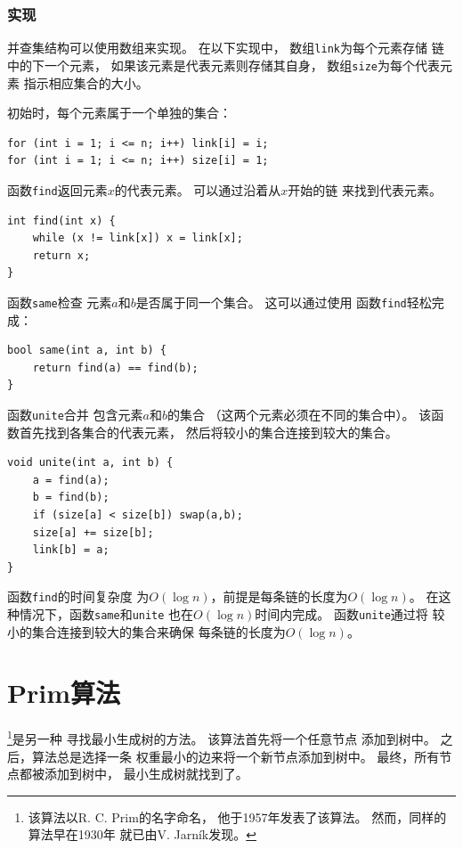 \subsubsection{实现}

并查集结构可以使用数组来实现。
在以下实现中，
数组\texttt{link}为每个元素存储
链中的下一个元素，
如果该元素是代表元素则存储其自身，
数组\texttt{size}为每个代表元素
指示相应集合的大小。

初始时，每个元素属于一个单独的集合：
\begin{lstlisting}
for (int i = 1; i <= n; i++) link[i] = i;
for (int i = 1; i <= n; i++) size[i] = 1;
\end{lstlisting}

函数\texttt{find}返回元素$x$的代表元素。
可以通过沿着从$x$开始的链
来找到代表元素。

\begin{lstlisting}
int find(int x) {
    while (x != link[x]) x = link[x];
    return x;
}
\end{lstlisting}

函数\texttt{same}检查
元素$a$和$b$是否属于同一个集合。
这可以通过使用
函数\texttt{find}轻松完成：

\begin{lstlisting}
bool same(int a, int b) {
    return find(a) == find(b);
}
\end{lstlisting}

\begin{samepage}
函数\texttt{unite}合并
包含元素$a$和$b$的集合
（这两个元素必须在不同的集合中）。
该函数首先找到各集合的代表元素，
然后将较小的集合连接到较大的集合。

\begin{lstlisting}
void unite(int a, int b) {
    a = find(a);
    b = find(b);
    if (size[a] < size[b]) swap(a,b);
    size[a] += size[b];
    link[b] = a;
}
\end{lstlisting}
\end{samepage}

函数\texttt{find}的时间复杂度
为$O(\log n)$，前提是每条链的长度为$O(\log n)$。
在这种情况下，函数\texttt{same}和\texttt{unite}
也在$O(\log n)$时间内完成。
函数\texttt{unite}通过将
较小的集合连接到较大的集合来确保
每条链的长度为$O(\log n)$。

\section{Prim算法}


\footnote{该算法以R. C. Prim的名字命名，
他于1957年发表了该算法\cite{pri57}。
然而，同样的算法早在1930年
就已由V. Jarník发现。}是另一种
寻找最小生成树的方法。
该算法首先将一个任意节点
添加到树中。
之后，算法总是选择一条
权重最小的边来将一个新节点添加到树中。
最终，所有节点都被添加到树中，
最小生成树就找到了。

